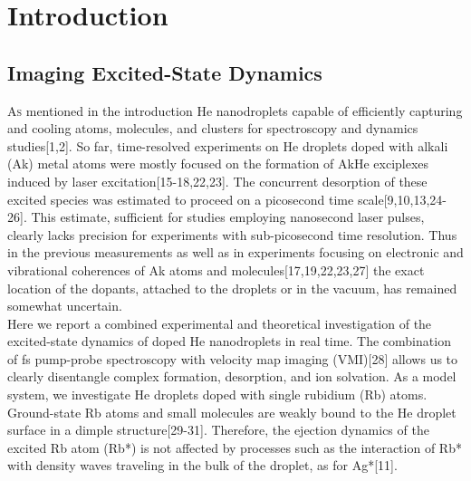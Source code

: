 \chapter{Introduction}
	\section{Imaging Excited-State Dynamics}
		\lettrine[lines=3,findent=3pt,nindent=0pt]{A}{s} mentioned in the introduction He nanodroplets capable of efficiently capturing and cooling atoms, molecules, and clusters for spectroscopy and dynamics studies[1,2]. So far, time-resolved experiments on He droplets doped with alkali (Ak) metal atoms were mostly focused on the formation of AkHe exciplexes induced by laser excitation[15-18,22,23]. The concurrent desorption of these excited species was estimated to proceed on a picosecond time scale[9,10,13,24-26]. This estimate, sufficient for studies employing nanosecond laser pulses, clearly lacks precision for experiments with sub-picosecond time resolution. Thus in the previous measurements as well as in experiments focusing on electronic and vibrational coherences of Ak atoms and molecules[17,19,22,23,27] the exact location of the dopants, attached to the droplets or in the vacuum, has remained somewhat uncertain.\\

		Here we report a combined experimental and theoretical investigation of the excited-state dynamics of doped He nanodroplets in real time. The combination of fs pump-probe spectroscopy with velocity map imaging (VMI)[28] allows us to clearly disentangle complex formation, desorption, and ion solvation. As a model system, we investigate He droplets doped with single rubidium (Rb) atoms. Ground-state Rb atoms and small molecules are weakly bound to the He droplet surface in a dimple structure[29-31]. Therefore, the ejection dynamics of the excited Rb atom (Rb*) is not affected by processes such as the interaction of Rb* with density waves traveling in the bulk of the droplet, as for Ag*[11].

